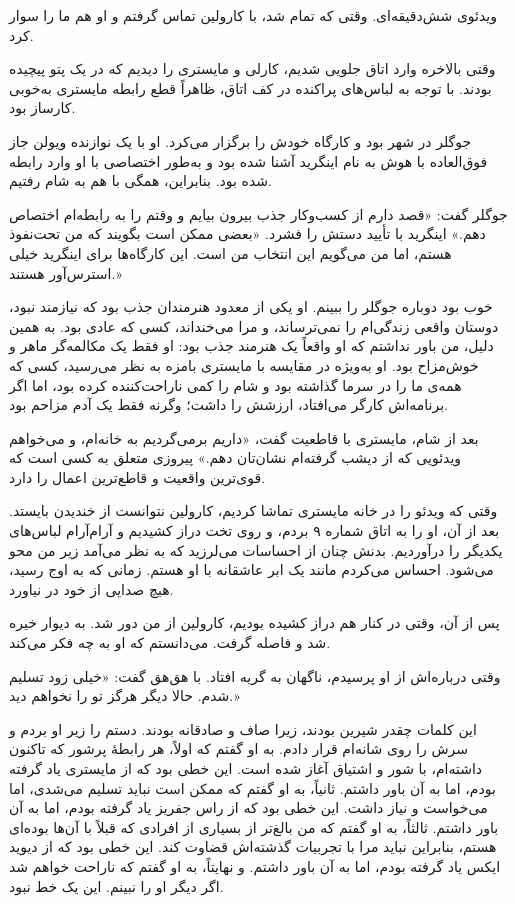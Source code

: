 

ویدئوی شش‌دقیقه‌ای. وقتی که تمام شد، با کارولین تماس گرفتم و او هم ما را سوار کرد.

وقتی بالاخره وارد اتاق جلویی شدیم، کارلی و مایستری را دیدیم که در یک پتو پیچیده بودند. با توجه به لباس‌های پراکنده در کف اتاق، ظاهراً قطع رابطه مایستری به‌خوبی کارساز بود.

جوگلر در شهر بود و کارگاه خودش را برگزار می‌کرد. او با یک نوازنده ویولن جاز فوق‌العاده با هوش به نام اینگرید آشنا شده بود و به‌طور اختصاصی با او وارد رابطه شده بود. بنابراین، همگی با هم به شام رفتیم.

جوگلر گفت: «قصد دارم از کسب‌وکار جذب بیرون بیایم و وقتم را به رابطه‌ام اختصاص دهم.» اینگرید با تأیید دستش را فشرد. «بعضی ممکن است بگویند که من تحت‌نفوذ هستم، اما من می‌گویم این انتخاب من است. این کارگاه‌ها برای اینگرید خیلی استرس‌آور هستند.»

خوب بود دوباره جوگلر را ببینم. او یکی از معدود هنرمندان جذب بود که نیازمند نبود، دوستان واقعی زندگی‌ام را نمی‌ترساند، و مرا می‌خنداند، کسی که عادی بود. به همین دلیل، من باور نداشتم که او واقعاً یک هنرمند جذب بود: او فقط یک مکالمه‌گر ماهر و خوش‌مزاح بود. او به‌ویژه در مقایسه با مایستری بامزه به نظر می‌رسید، کسی که همه‌ی ما را در سرما گذاشته بود و شام را کمی ناراحت‌کننده کرده بود، اما اگر برنامه‌اش کارگر می‌افتاد، ارزشش را داشت؛ وگرنه فقط یک آدم مزاحم بود.

بعد از شام، مایستری با قاطعیت گفت، «داریم برمی‌گردیم به خانه‌ام، و می‌خواهم ویدئویی که از دیشب گرفته‌ام نشان‌تان دهم.» پیروزی متعلق به کسی است که قوی‌ترین واقعیت و قاطع‌ترین اعمال را دارد.

وقتی که ویدئو را در خانه مایستری تماشا کردیم، کارولین نتوانست از خندیدن بایستد. بعد از آن، او را به اتاق شماره ۹ بردم، و روی تخت دراز کشیدیم و آرام‌آرام لباس‌های یکدیگر را درآوردیم. بدنش چنان از احساسات می‌لرزید که به نظر می‌آمد زیر من محو می‌شود. احساس می‌کردم مانند یک ابر عاشقانه با او هستم. زمانی که به اوج رسید، هیچ صدایی از خود در نیاورد.

پس از آن، وقتی در کنار هم دراز کشیده بودیم، کارولین از من دور شد. به دیوار خیره شد و فاصله گرفت. می‌دانستم که او به چه فکر می‌کند.

وقتی درباره‌اش از او پرسیدم، ناگهان به گریه افتاد. با هق‌هق گفت: «خیلی زود تسلیم شدم. حالا دیگر هرگز تو را نخواهم دید.»

این کلمات چقدر شیرین بودند، زیرا صاف و صادقانه بودند. دستم را زیر او بردم و سرش را روی شانه‌ام قرار دادم. به او گفتم که اولاً، هر رابطهٔ پرشور که تاکنون داشته‌ام، با شور و اشتیاق آغاز شده است. این خطی بود که از مایستری یاد گرفته بودم، اما به آن باور داشتم. ثانیاً، به او گفتم که ممکن است نباید تسلیم می‌شدی، اما می‌خواست و نیاز داشت. این خطی بود که از راس جفریز یاد گرفته بودم، اما به آن باور داشتم. ثالثاً، به او گفتم که من بالغ‌تر از بسیاری از افرادی که قبلاً با آن‌ها بوده‌ای هستم، بنابراین نباید مرا با تجربیات گذشته‌اش قضاوت کند. این خطی بود که از دیوید ایکس یاد گرفته بودم، اما به آن باور داشتم. و نهایتاً، به او گفتم که ناراحت خواهم شد اگر دیگر او را نبینم. این یک خط نبود.